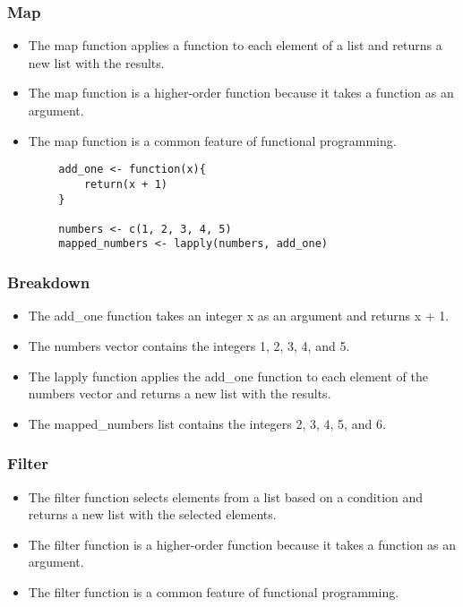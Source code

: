 \documentclass[serif, 9pt, aspectratio=32]{beamer}
\begin{document}
\begin{frame}
    \centering
    \frametitle{Map}
    \begin{itemize}
        \setlength{\itemsep}{2em}
        \item The map function applies a function to each element of a list and returns a new list with the results.
        \item The map function is a higher-order function because it takes a function as an argument.
        \item The map function is a common feature of functional programming.
    \end{itemize}
\end{frame}

\begin{frame}[fragile]
    \begin{lstlisting}
        add_one <- function(x){
            return(x + 1)
        }

        numbers <- c(1, 2, 3, 4, 5)
        mapped_numbers <- lapply(numbers, add_one)
    \end{lstlisting}
\end{frame}

\begin{frame}
    \centering
    \frametitle{Breakdown}
    \begin{itemize}
        \setlength{\itemsep}{2em}
        \item The add\_one function takes an integer x as an argument and returns x + 1.
        \item The numbers vector contains the integers 1, 2, 3, 4, and 5.
        \item The lapply function applies the add\_one function to each element of the numbers vector and returns a new list with the results.
        \item The mapped\_numbers list contains the integers 2, 3, 4, 5, and 6.
    \end{itemize}
\end{frame}

\begin{frame}
    \centering
    \frametitle{Filter}
    \begin{itemize}
        \setlength{\itemsep}{2em}
        \item The filter function selects elements from a list based on a condition and returns a new list with the selected elements.
        \item The filter function is a higher-order function because it takes a function as an argument.
        \item The filter function is a common feature of functional programming.
    \end{itemize}
\end{frame}
\end{document}
